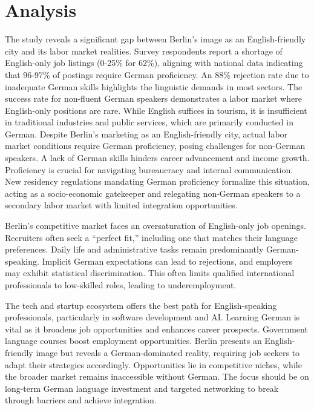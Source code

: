 \section{Analysis}
The study reveals a significant gap between Berlin’s image as an English-friendly city and its labor market realities. Survey respondents report a shortage of English-only job listings (0-25\% for 62\%), aligning with national data indicating that 96-97\% of postings require German proficiency. An 88\% rejection rate due to inadequate German skills highlights the linguistic demands in most sectors. The success rate for non-fluent German speakers demonstrates a labor market where English-only positions are rare. While English suffices in tourism, it is insufficient in traditional industries and public services, which are primarily conducted in German. Despite Berlin’s marketing as an English-friendly city, actual labor market conditions require German proficiency, posing challenges for non-German speakers. A lack of German skills hinders career advancement and income growth. Proficiency is crucial for navigating bureaucracy and internal communication. New residency regulations mandating German proficiency formalize this situation, acting as a socio-economic gatekeeper and relegating non-German speakers to a secondary labor market with limited integration opportunities.

Berlin’s competitive market faces an oversaturation of English-only job openings. Recruiters often seek a “perfect fit,” including one that matches their language preferences. Daily life and administrative tasks remain predominantly German-speaking. Implicit German expectations can lead to rejections, and employers may exhibit statistical discrimination. This often limits qualified international professionals to low-skilled roles, leading to underemployment.

The tech and startup ecosystem offers the best path for English-speaking professionals, particularly in software development and AI. Learning German is vital as it broadens job opportunities and enhances career prospects. Government language courses boost employment opportunities. Berlin presents an English-friendly image but reveals a German-dominated reality, requiring job seekers to adapt their strategies accordingly. Opportunities lie in competitive niches, while the broader market remains inaccessible without German. The focus should be on long-term German language investment and targeted networking to break through barriers and achieve integration.
